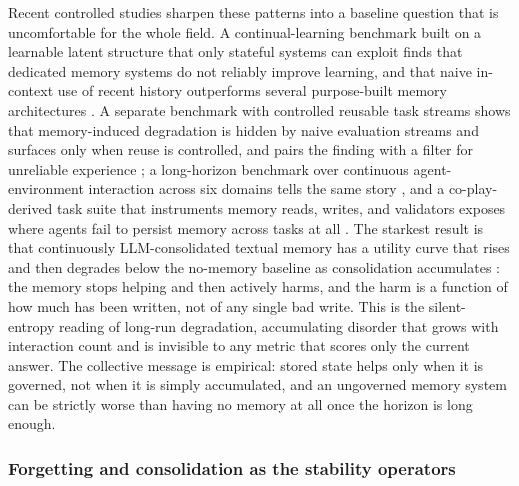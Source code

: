 Recent controlled studies sharpen these patterns into a baseline question that is uncomfortable for the whole field. A continual-learning benchmark built on a learnable latent structure that only stateful systems can exploit finds that dedicated memory systems do not reliably improve learning, and that naive in-context use of recent history outperforms several purpose-built memory architectures \citep{asawa2026clbench}. A separate benchmark with controlled reusable task streams shows that memory-induced degradation is hidden by naive evaluation streams and surfaces only when reuse is controlled, and pairs the finding with a filter for unreliable experience \citep{shu2026agentcl}; a long-horizon benchmark over continuous agent-environment interaction across six domains tells the same story \citep{zhao2026amabench}, and a co-play-derived task suite that instruments memory reads, writes, and validators exposes where agents fail to persist memory across tasks at all \citep{doss2026minenpc}. The starkest result is that continuously LLM-consolidated textual memory has a utility curve that rises and then degrades below the no-memory baseline as consolidation accumulates \citep{zhang2026usefulmemoriesfaulty}: the memory stops helping and then actively harms, and the harm is a function of how much has been written, not of any single bad write. This is the silent-entropy reading of long-run degradation, accumulating disorder that grows with interaction count and is invisible to any metric that scores only the current answer. The collective message is empirical: stored state helps only when it is governed, not when it is simply accumulated, and an ungoverned memory system can be strictly worse than having no memory at all once the horizon is long enough.

\subsubsection{Forgetting and consolidation as the stability operators}

